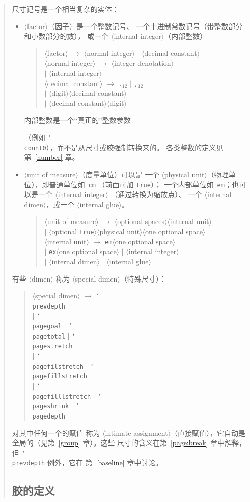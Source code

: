 \documentclass[a4paper]{rapport3}
\def\nl{\protect\\}\def\n#1{{\tt #1}}\def\cs#1{{\tt\char`\\#1}}\let\csc\cs
\def\gr#1{$\langle$#1$\rangle$}\def\key#1{{\tt#1}}
\def\alt{}\def\altt{}%
\newenvironment{disp}{\begin{quotation}}{\end{quotation}}
\begin{document}
\begin{disp}
尺寸记号是一个相当复杂的实体：
\begin{itemize} \item \gr{factor}（因子）是一个整数记号、
 一个十进制常数记号（带整数部分和小数部分的数），
 或一个 \gr{internal integer}（内部整数）
 \begin{disp}\PopIndentLevel
      \gr{factor} $\longrightarrow$ \gr{normal integer} 
      $|$ \gr{decimal constant}\nl
      \gr{normal integer} $\longrightarrow$ \gr{integer denotation}\nl
      \indent $|$ \gr{internal integer}\nl
      \gr{decimal constant} $\longrightarrow$ \n{.$_{12}$}
      $|$ \n{,$_{12}$}\nl
      \indent $|$ \gr{digit}\gr{decimal constant}\nl
      \indent $|$ \gr{decimal constant}\gr{digit}
 \end{disp}
 内部整数是一个“真正的”整数参数
\alt
（例如 \cs{count0}），而不是从尺寸或胶强制转换来的。
各类整数的定义见第~\ref{number} 章。
\item \gr{unit of measure}（度量单位）可以是
 一个 \gr{physical unit}（物理单位），即普通单位如~\n{cm}
（前面可加 \n{true}）；
 一个内部单位如~\n{em}；也可以是一个 \gr{internal integer}
（通过转换为缩放点）、
 一个 \gr{internal dimen}，或一个 \gr{internal glue}。
 \begin{disp}\PopIndentLevel
      \gr{unit of measure} $\longrightarrow$
      \gr{optional spaces}\gr{internal unit}\nl
      \indent $|$ 
      \gr{optional \n{true}}\gr{physical unit}\gr{one optional space}\nl 
      \gr{internal unit} $\longrightarrow$ 
      \n{em}\gr{one optional space}\nl
      \indent $|$ \n{ex}\gr{one optional space}
              $|$ \gr{internal integer}\nl
      \indent $|$ \gr{internal dimen} $|$ \gr{internal glue}
      \end{disp}
\end{itemize}

有些 \gr{dimen} 称为 \gr{special dimen}（特殊尺寸）：\label{special:dimen:list}
\begin{disp}\gr{special dimen} $\longrightarrow$ \cs{prevdepth}\nl
     \indent $|$ \cs{pagegoal} $|$ \cs{pagetotal} $|$ \cs{pagestretch}\nl
     \indent $|$ \cs{pagefilstretch} $|$ \cs{pagefillstretch}\nl
     \indent $|$ \cs{pagefilllstretch} $|$ \cs{pageshrink} $|$ \cs{pagedepth}
     \end{disp}
对其中任何一个的赋值
称为 \gr{intimate assignment}（直接赋值），它自动是
全局的（见第~\ref{group} 章）。这些
尺寸的含义在第~\ref{page:break} 章中解释，
但 \cs{prevdepth} 例外，它在
第~\ref{baseline} 章中讨论。

\subsection{胶的定义}


\end{disp}
\end{document}
